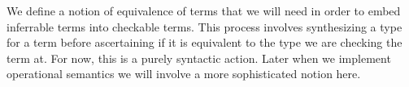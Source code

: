 \begin{code}
\>[0]\AgdaSpace{}%
\AgdaSymbol{:}%
\>[130I]\AgdaSpace{}%
%
\>[42]\<%
\\
\>[.][@{}l@{}]\<[130I]%
\>[13]%
\>[42]\<%
\\
%
\>[13]\AgdaSpace{}%
%
\>[42]\<%
\\
%
\>[13]\AgdaSymbol{(}\AgdaSpace{}%
\AgdaSymbol{:}\AgdaSpace{}%
\AgdaSpace{}%
\AgdaSpace{}%
\AgdaSymbol{)}%
\>[42]\<%
\\
%
\>[13]\AgdaSymbol{(}\AgdaSpace{}%
\AgdaSymbol{:}\AgdaSpace{}%
\AgdaSpace{}%
\AgdaSpace{}%
\AgdaSymbol{)}%
\>[42]\<%
\\
%
\>[13]\AgdaSpace{}%
\AgdaSymbol{(}\AgdaSpace{}%
\AgdaSpace{}%
\AgdaSymbol{)}\<%
\end{code}

We define a notion of equivalence of terms that we will need in order
to embed inferrable terms into checkable terms. This process involves
synthesizing a type for a term before ascertaining if it is equivalent
to the type we are checking the term at. For now, this is a
purely syntactic action. Later when we implement operational semantics
we will involve a more sophisticated notion here.

